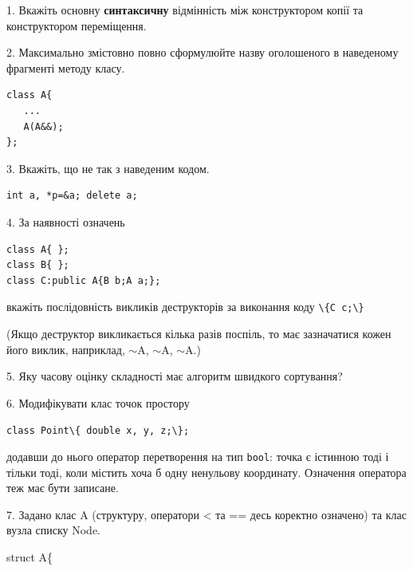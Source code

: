 \documentclass[12pt, ukrainian]{article}
\def\code#1{\Verb!#1!}
\begin{document}
{%
1. Вкажіть основну \textbf{синтаксичну} відмінність між конструктором копії та конструктором переміщення.%
\par
\vspace{2mm}
2. Максимально змістовно повно сформулюйте назву оголошеного в наведеному фрагменті методу класу.
\vspace{-3mm}
\begin{verbatim}class A{
   ...
   A(A&&);
};\end{verbatim}
\vspace{-3mm}
\par
\vspace{2mm}
3. Вкажіть, що не так з наведеним кодом.
\vspace{-3mm}
\begin{verbatim}int a, *p=&a; delete a;\end{verbatim}
\vspace{-3mm}
\par
\vspace{2mm}
4. За наявності означень
\vspace{-3mm}
\begin{verbatim}
class A{ };
class B{ };
class C:public A{B b;A a;};\end{verbatim}
\vspace{-3mm}
вкажіть послідовність викликів деструкторів за виконання коду \code{\{C c;\}} 

(Якщо деструктор викликається кілька разів поспіль, то має зазначатися кожен його виклик, наприклад, $\sim$A, $\sim$A, $\sim$A.)

\vspace{2mm}
5. Яку часову оцінку складності має алгоритм швидкого сортування?
\par
\vspace{2mm}
6. Модифікувати клас точок простору 

\qquad\code{class Point\{ double x, y, z;\};}


додавши до нього оператор перетворення на тип \code{bool}: точка є істинною тоді і тільки тоді, коли містить хоча б одну ненульову координату. Означення оператора теж має бути записане.%
\par
\vspace{2mm}
7. 
Задано клас A (структуру, оператори < та == десь коректно означено) та клас вузла списку Node.

struct A\{

}
\end{document}
